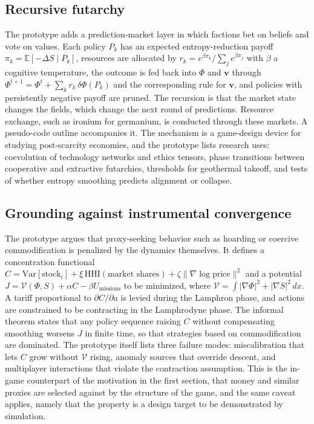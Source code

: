 \documentclass[11pt]{article}
\begin{document}
\subsection{Recursive futarchy}

The prototype adds a prediction-market layer in which factions bet on beliefs and vote on values. Each policy $P_k$ has an expected entropy-reduction payoff $\pi_k=\mathbb{E}[-\Delta S\mid P_k]$, resources are allocated by $r_k=e^{\beta\pi_k}/\sum_je^{\beta\pi_j}$ with $\beta$ a cognitive temperature, the outcome is fed back into $\Phi$ and $\mathbf{v}$ through $\Phi^{t+1}=\Phi^t+\sum_kr_k\,\delta\Phi(P_k)$ and the corresponding rule for $\mathbf{v}$, and policies with persistently negative payoff are pruned. The recursion is that the market state changes the fields, which change the next round of predictions. Resource exchange, such as ironium for germanium, is conducted through these markets. A pseudo-code outline accompanies it. The mechanism is a game-design device for studying post-scarcity economies, and the prototype lists research uses: coevolution of technology networks and ethics tensors, phase transitions between cooperative and extractive futarchies, thresholds for geothermal takeoff, and tests of whether entropy smoothing predicts alignment or collapse.

\subsection{Grounding against instrumental convergence}

The prototype argues that proxy-seeking behavior such as hoarding or coercive commodification is penalized by the dynamics themselves. It defines a concentration functional $C=\mathrm{Var}[\text{stock}_i]+\xi\,\mathrm{HHI}(\text{market shares})+\zeta\lVert\nabla\log\text{price}\rVert^2$ and a potential $J=\mathcal{V}(\Phi,S)+\alpha C-\beta U_{\text{missions}}$ to be minimized, where $\mathcal{V}=\int|\nabla\Phi|^2+|\nabla S|^2\,dx$. A tariff proportional to $\partial C/\partial a$ is levied during the Lamphron phase, and actions are constrained to be contracting in the Lamphrodyne phase. The informal theorem states that any policy sequence raising $C$ without compensating smoothing worsens $J$ in finite time, so that strategies based on commodification are dominated. The prototype itself lists three failure modes: miscalibration that lets $C$ grow without $\mathcal{V}$ rising, anomaly sources that override descent, and multiplayer interactions that violate the contraction assumption. This is the in-game counterpart of the motivation in the first section, that money and similar proxies are selected against by the structure of the game, and the same caveat applies, namely that the property is a design target to be demonstrated by simulation.
\end{document}
